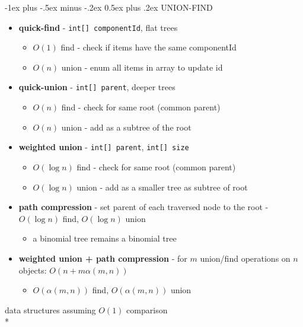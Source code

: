 \documentclass[10pt, landscape]{article}
\makeatletter
\newenvironment{tightcenter}{%
  \setlength\topsep{0pt}
  \setlength\parskip{0pt}
  \begin{center}
}{%
  \end{center}
}
\renewcommand{\section}{\@startsection{section}{1}{0mm}%
                                {-1ex plus -.5ex minus -.2ex}%
                                {0.5ex plus .2ex}%
                                {\normalfont\large\bfseries}}
\newcommand{\code}[1]{\textcolor{mygreen}{\texttt{#1}}}
\makeatother
\begin{document}
\begin{multicols}{4}
\section{UNION-FIND}
\begin{itemize}
    \item \textbf{quick-find} - \code{int[] componentId}, flat trees
    \begin{itemize}
        \item $O(1)$ find - check if items have the same componentId
        \item $O(n)$ union - enum all items in array to update id
    \end{itemize}
    \item \textbf{quick-union} - \code{int[] parent}, deeper trees
    \begin{itemize}
        \item $O(n)$ find - check for same root (common parent)
        \item $O(n)$ union - add as a subtree of the root
    \end{itemize}
    \item \textbf{weighted union} - \code{int[] parent}, \code{int[] size}
    \begin{itemize}
        \item $O(\log n)$ find - check for same root (common parent)
        \item $O(\log n)$ union - add as a smaller tree as subtree of root
    \end{itemize}
    \item \textbf{path compression} - set parent of each traversed node to the root - $O(\log n)$ find, $O(\log n)$ union
    \begin{itemize}
        \item a binomial tree remains a binomial tree
    \end{itemize}
    \item \textbf{weighted union + path compression} - for $m$ union/find operations on $n$ objects: $O(n + m\alpha (m, n))$
    \begin{itemize}
        \item $O(\alpha (m, n))$ find, $O(\alpha (m, n))$ union
    \end{itemize}
\end{itemize}
\begin{tightcenter}
    data structures assuming $O(1)$ comparison 
\\* \begin{tabular}{| c | c | c |}\hline

\end{tabular}
\end{tightcenter}
\end{multicols}
\end{document}
